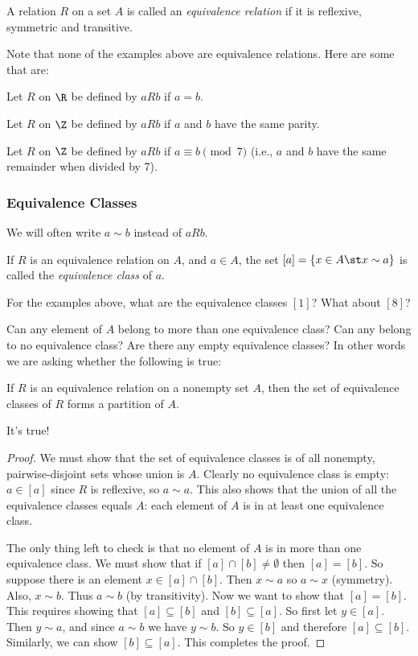\begin{definition}
 A relation $R$ on a set $A$ is called an {\em equivalence relation} if it is reflexive, symmetric and transitive.
\end{definition}

Note that none of the examples above are equivalence relations.  Here are some that are:
\begin{example}
 Let $R$ on $\R$ be defined by $aRb$ if $a = b$. 
 
 Let $R$ on $\Z$ be defined by $aRb$ if $a$ and $b$ have the same parity. 
 
 Let $R$ on $\Z$ be defined by $aRb$ if $a \equiv b \pmod 7$  (i.e., $a$ and $b$ have the same remainder when divided by 7).
\end{example}

\subsubsection*{Equivalence Classes}

We will often write $a \sim b$ instead of $aRb$.

\begin{definition}
 If $R$ is an equivalence relation on $A$, and $a \in A$, the set $[a] = \{x \in A \st x \sim a\}$ is called the {\em equivalence class} of $a$.  
\end{definition}

For the examples above, what are the equivalence classes $[1]$?  What about $[8]$?

Can any element of $A$ belong to more than one equivalence class?  Can any belong to no equivalence class?  Are there any empty equivalence classes?  In other words we are asking whether the following is true:

\begin{theorem}
 If $R$ is an equivalence relation on a nonempty set $A$, then the set of equivalence classes of $R$ forms a partition of $A$.
\end{theorem}

It's true!
\begin{proof}
 We must show that the set of equivalence classes is of all nonempty, pairwise-disjoint sets whose union is $A$.  Clearly no equivalence class is empty: $a \in [a]$ since $R$ is reflexive, so $a \sim a$.  This also shows that the union of all the equivalence classes equals $A$: each element of $A$ is in at least one equivalence class.
 
 The only thing left to check is that no element of $A$ is in more than one equivalence class.  We must show that if $[a]\cap[b] \ne \emptyset$ then $[a] = [b]$.  So suppose there is an element $x \in [a] \cap [b]$.  Then $x \sim a$ so $a \sim x$ (symmetry).  Also, $x \sim b$. Thus $a \sim b$ (by transitivity).  Now we want to show that $[a] = [b]$.  This requires showing that $[a] \subseteq [b]$ and $[b]\subseteq [a]$.  So first let $y \in [a]$.  Then $y \sim a$, and since $a \sim b$ we have $y \sim b$.  So $y \in [b]$ and therefore $[a]\subseteq [b]$.  Similarly, we can show $[b] \subseteq [a]$.  This completes the proof.
\end{proof}

